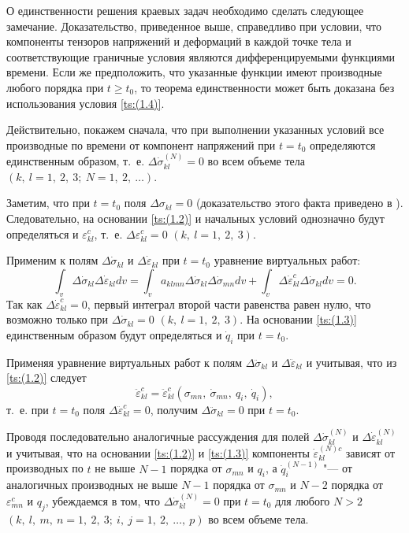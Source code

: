 \smallskip

О единственности решения краевых задач необходимо сделать следующее замечание. 
Доказательство, приведенное выше, справедливо при условии, что компоненты тензоров напряжений и деформаций в каждой точке тела и соответствующие граничные условия являются дифференцируемыми функциями времени. 
Если же предположить, что указанные функции имеют производные любого порядка при $t\geq t_{0}$, то теорема единственности может быть доказана без использования условия \eqref{ts:(1.4)}.

Действительно, покажем сначала, что при выполнении указанных условий все производные по времени от компонент напряжений при $t=t_{0}$ определяются единственным образом, т.~е. $\Delta\dot{\sigma}_{kl}^{(N)}=0$ во всем объеме тела $(k,\:l=1,\:2,\:3;\ N=1,\:2,\:\dots)$.

Заметим, что при $t=t_{0}$ поля $\Delta\sigma_{kl}=0$  (доказательство этого факта приведено в \cite{ts:Koiter}). 
Следовательно, на основании \eqref{ts:(1.2)} и начальных условий однозначно будут определяться и $\varepsilon_{kl}^{c}$, т.~е.  $\Delta\varepsilon_{kl}^{c}=0$ $(k,\:l=1,\:2,\:3)$.

Применим к полям $\Delta\dot{\sigma}_{kl}$ и $\Delta\dot{\varepsilon}_{kl}$ при $t=t_{0}$ уравнение виртуальных работ:
$$
\int_{v}\Delta\dot{\sigma}_{kl}\Delta\dot{\varepsilon}_{kl}dv=\int_{v}a_{klmn}\Delta\dot{\sigma}_{kl}\Delta\dot{\sigma}_{mn}dv+
\int_{v}\Delta\dot{\varepsilon}_{kl}^{c}\Delta\dot{\sigma}_{kl}dv=0.
$$
Так как $\Delta\dot{\varepsilon}_{kl}^{c}=0$, первый интеграл второй части равенства равен нулю, что возможно только при 
$\Delta\dot{\sigma}_{kl}=0$ $(k,\:l=1,\:2,\:3)$. 
На основании  \eqref{ts:(1.3)} единственным образом будут определяться и $\dot{q}_{i}$ при $t=t_{0}$.

Применяя уравнение виртуальных работ к полям $\Delta\ddot{\sigma}_{kl}$ и $\Delta\ddot{\varepsilon}_{kl}$ и учитывая, что из \eqref{ts:(1.2)} следует 
$$\ddot{\varepsilon}_{kl}^{c}=\ddot{\varepsilon}_{kl}^{c}(\sigma_{mn},\:\dot{\sigma}_{mn},\:q_{i},\:\dot{q}_{i}),$$ 
т.~е. при $t=t_{0}$ поля $\Delta\ddot{\varepsilon}_{kl}^{c}=0$, получим $\Delta\ddot{\sigma}_{kl}=0$ при $t=t_{0}$.

Проводя последовательно аналогичные рассуждения для полей $\Delta\dot{\sigma}_{kl}^{(N)}$ и $\Delta\dot{\varepsilon}_{kl}^{(N)}$  и учитывая, что на основании \eqref{ts:(1.2)} и \eqref{ts:(1.3)}  компоненты $\dot{\varepsilon}_{kl}^{(N)c}$ зависят от производных по $t$ не выше $N-1$ порядка от $\sigma_{mn}$ и $q_{i}$, а 
$\dot{q}_{i}^{(N-1)}$  "--- от аналогичных производных не выше $N-1$ порядка от $\sigma_{mn}$ и $N-2$ порядка от $\varepsilon_{mn}^{c}$ и $q_{j}$, убеждаемся в том, что $\Delta\dot{\sigma}_{kl}^{(N)}=0$ при $t=t_{0}$ для любого $N>2$ 
$(k,\:l,\:m,\:n=1,\:2,\:3;\ i,\:j=1,\:2,\:\ldots,\:p)$ во всем объеме тела.

